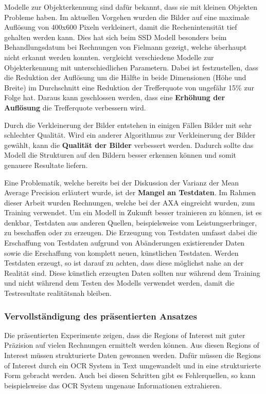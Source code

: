 Modelle zur Objekterkennung sind dafür bekannt, dass sie mit kleinen Objekten Probleme haben. Im aktuellen Vorgehen wurden die Bilder auf eine maximale Auflösung von 400x600 Pixeln verkleinert, damit die Rechenintensität tief gehalten werden kann. Dies hat sich beim SSD Modell besonders beim Behandlungsdatum bei Rechnungen von Fielmann gezeigt, welche überhaupt nicht erkannt werden konnten. \textcite{SSDFRCNN} vergleicht verschiedene Modelle zur Objekterkennung mit unterschiedlichen Parametern. Dabei ist festzustellen, dass die Reduktion der Auflösung um die Hälfte in beide Dimensionen (Höhe und Breite) im Durchschnitt eine Reduktion der Trefferquote von ungefähr 15\% zur Folge hat. Daraus kann geschlossen werden, dass eine \textbf{Erhöhung der Auflösung} die Trefferquote verbessern wird.

Durch die Verkleinerung der Bilder entstehen in einigen Fällen Bilder mit sehr schlechter Qualität. Wird ein anderer Algorithmus zur Verkleinerung der Bilder gewählt, kann die \textbf{Qualität der Bilder} verbessert werden. Dadurch sollte das Modell die Strukturen auf den Bildern besser erkennen können und somit genauere Resultate liefern.

Eine Problematik, welche bereits bei der Diskussion der Varianz der Mean Average Precision erläutert wurde, ist der \textbf{Mangel an Testdaten}. Im Rahmen dieser Arbeit wurden Rechnungen, welche bei der AXA eingreicht wurden, zum Training verwendet. Um ein Modell in Zukunft besser trainieren zu können, ist es denkbar, Testdaten aus anderen Quellen, beispielsweise vom Leistungserbringer, zu beschaffen oder zu erzeugen. Die Erzeugung von Testdaten umfasst dabei die Erschaffung von Testdaten aufgrund von Abänderungen existierender Daten sowie die Erschaffung von komplett neuen, künstlichen Testdaten. Werden Testdaten erzeugt, so ist darauf zu achten, dass diese möglichst nahe an der Realität sind. Diese künstlich erzeugten Daten sollten nur während dem Training und nicht während dem Testen des Modells verwendet werden, damit die Testresultate realitätsnah bleiben.

\subsubsection{Vervollständigung des präsentierten Ansatzes}
\label{chap:ie-quality-check}

Die präsentierten Experimente zeigen, dass die Regions of Interest mit guter Präzision auf vielen Rechnungen ermittelt werden können. Aus diesen Regions of Interest müssen strukturierte Daten gewonnen werden. Dafür müssen die Regions of Interest durch ein OCR System in Text umgewandelt und in eine strukturierte Form gebracht werden. Auch bei diesen Schritten gibt es Fehlerquellen, so kann beispielsweise das OCR System ungenaue Informationen extrahieren.

